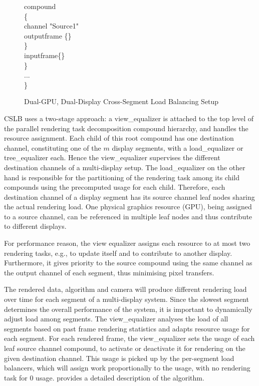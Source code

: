 \begin{figure}[h!t]
{\begin{minipage}[b]{0.46\textwidth}
{\quad \quad compound \\
\quad \quad \{  \\
\quad \quad \quad channel "Source1"  \\
\quad \quad \quad outputframe \{\}  \\
\quad \quad \} \\
\quad \quad inputframe\{\} \\
\quad \} \\
\quad ... \\
\} \\
	\label{fViewEqualizerConfig}}
	\end{minipage}
   }
\caption{Dual-GPU, Dual-Display Cross-Segment Load Balancing Setup}
\label{fViewEqualizer}
\end{figure}

CSLB uses a two-stage approach: a {\sf view\_equalizer} is attached to the top
level of the parallel rendering task decomposition compound hierarchy, and
handles the resource assignment. Each child of this root compound has one
destination channel, constituting one of the $m$ display segments, with a {\sf
load\_equalizer} or \textsf{tree\_equalizer} each. Hence the {\sf
view\_equalizer} supervises the different destination channels of a
multi-display setup. The {\sf load\_equalizer} on the other hand is responsible
for the partitioning of the rendering task among its child compounds using the
precomputed usage for each child. Therefore, each destination channel of a
display segment has its source channel leaf nodes sharing the actual rendering
load. One physical graphics resource (GPU), being assigned to a source channel,
can be referenced in multiple leaf nodes and thus contribute to different
displays.

For performance reason, the view equalizer assigns each resource to at most two
rendering tasks, e.g., to update itself and to contribute to another display.
Furthermore, it gives priority to the source compound using the same channel as
the output channel of each segment, thus minimising pixel transfers.

The rendered data, algorithm and camera will produce different rendering load
over time for each segment of a multi-display system. Since the slowest segment
determines the overall performance of the system, it is important to
dynamically adjust load among segments. The {\sf view\_equalizer} analyses the
load of all segments based on past frame rendering statistics and adapts
resource usage for each segment. For each rendered frame, the {\sf
view\_equalizer} sets the usage of each leaf source channel compound, to
activate or deactivate it for rendering on the given destination channel. This
usage is picked up by the per-segment load balancers, which will assign work
proportionally to the usage, with no rendering task for $0$ usage.
\cite{EEP:11} provides a detailed description of the algorithm.

